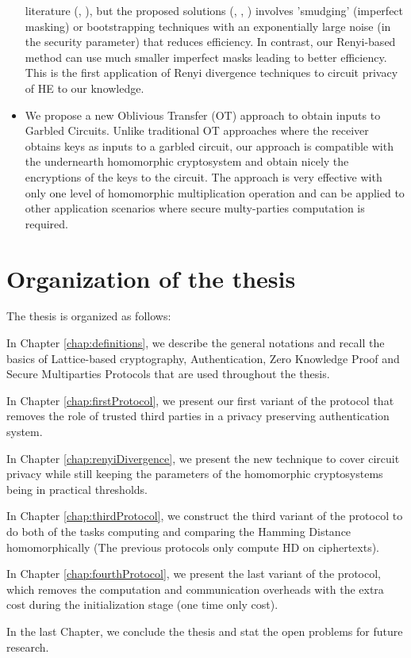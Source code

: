 \begin{itemize}
  literature (\cite{sander1999non}, \cite{ishai2007evaluating}), but the
  proposed solutions (\cite{homenc}, \cite{ostrovsky2014maliciously},
  \cite{gentry2010hop}) involves 'smudging' (imperfect masking) or bootstrapping
  techniques with an exponentially large noise (in the security parameter) that
  reduces efficiency. In contrast, our Renyi-based method can use much smaller
  imperfect masks leading to better efficiency. This is the first application of
  Renyi divergence techniques to circuit privacy of HE to our knowledge.
\item We propose a new Oblivious Transfer (OT) approach to obtain inputs to
  Garbled Circuits. Unlike traditional OT approaches where the receiver obtains
  keys as inputs to a garbled circuit, our approach is compatible with the
  undernearth homomorphic cryptosystem and obtain nicely the encryptions of the
  keys to the circuit. The approach is very effective with only one level of
  homomorphic multiplication operation and can be applied to other application
  scenarios where secure multy-parties computation is required.
\end{itemize}

\section{Organization of the thesis}
The thesis is organized as follows:
\begin{description}
\item In Chapter \ref{chap:definitions}, we describe the general notations and
  recall the basics of Lattice-based cryptography, Authentication, Zero
  Knowledge Proof and Secure Multiparties Protocols that are used throughout the
  thesis.
\item In Chapter \ref{chap:firstProtocol}, we present our first variant of the
  protocol that removes the role of trusted third parties in a privacy
  preserving authentication system.
\item In Chapter \ref{chap:renyiDivergence}, we present the new technique to
  cover circuit privacy while still keeping the parameters of the homomorphic
  cryptosystems being in practical thresholds.
\item In Chapter \ref{chap:thirdProtocol}, we construct the third variant of the
  protocol to do both of the tasks computing and comparing the Hamming Distance
  homomorphically (The previous protocols only compute HD on ciphertexts).
\item In Chapter \ref{chap:fourthProtocol}, we present the last variant of the
  protocol, which removes the computation and communication overheads with the
  extra cost during the initialization stage (one time only cost).
\item In the last Chapter, we conclude the thesis and stat the open problems for
  future research.
\end{description}
\label{sec:introOrganize}
